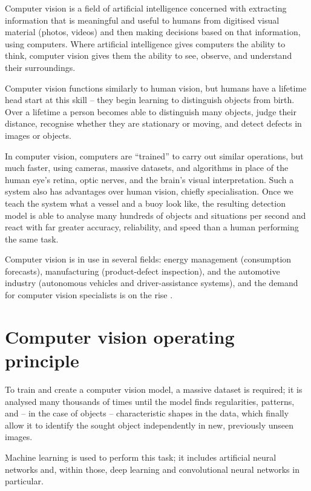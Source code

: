 
Computer vision is a field of artificial intelligence concerned with extracting information that is meaningful and useful to humans from digitised visual material (photos, videos) and then making decisions based on that information, using computers. Where artificial intelligence gives computers the ability to think, computer vision gives them the ability to see, observe, and understand their surroundings.

Computer vision functions similarly to human vision, but humans have a lifetime head start at this skill -- they begin learning to distinguish objects from birth. Over a lifetime a person becomes able to distinguish many objects, judge their distance, recognise whether they are stationary or moving, and detect defects in images or objects.

In computer vision, computers are ``trained'' to carry out similar operations, but much faster, using cameras, massive datasets, and algorithms in place of the human eye's retina, optic nerves, and the brain's visual interpretation. Such a system also has advantages over human vision, chiefly specialisation. Once we teach the system what a vessel and a buoy look like, the resulting detection model is able to analyse many hundreds of objects and situations per second and react with far greater accuracy, reliability, and speed than a human performing the same task.

Computer vision is in use in several fields: energy management (consumption forecasts), manufacturing (product-defect inspection), and the automotive industry (autonomous vehicles and driver-assistance systems), and the demand for computer vision specialists is on the rise \cite{ref14}.

\section{Computer vision operating principle}\label{computer-vision-operating-principle}

To train and create a computer vision model, a massive dataset is required; it is analysed many thousands of times until the model finds regularities, patterns, and -- in the case of objects -- characteristic shapes in the data, which finally allow it to identify the sought object independently in new, previously unseen images.

Machine learning is used to perform this task; it includes artificial neural networks and, within those, deep learning and convolutional neural networks in particular.

